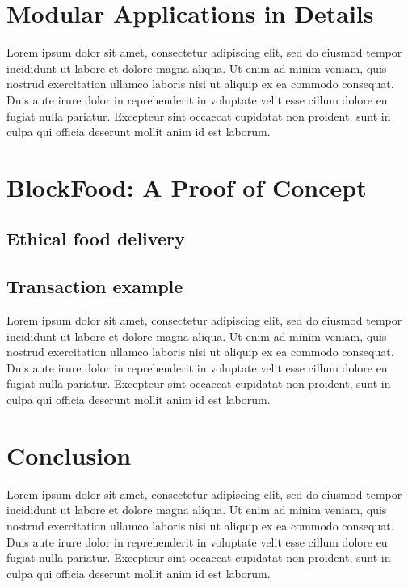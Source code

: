 \documentclass[a4paper]{article}
\begin{document}
\newpage

\section{Modular Applications in Details}

Lorem ipsum dolor sit amet, consectetur adipiscing elit, sed do eiusmod tempor incididunt ut labore et dolore magna aliqua. Ut enim ad minim veniam, quis nostrud exercitation ullamco laboris nisi ut aliquip ex ea commodo consequat. Duis aute irure dolor in reprehenderit in voluptate velit esse cillum dolore eu fugiat nulla pariatur. Excepteur sint occaecat cupidatat non proident, sunt in culpa qui officia deserunt mollit anim id est laborum.

\newpage

\section{BlockFood: A Proof of Concept}

\subsection{Ethical food delivery}

\subsection{Transaction example}

Lorem ipsum dolor sit amet, consectetur adipiscing elit, sed do eiusmod tempor incididunt ut labore et dolore magna aliqua. Ut enim ad minim veniam, quis nostrud exercitation ullamco laboris nisi ut aliquip ex ea commodo consequat. Duis aute irure dolor in reprehenderit in voluptate velit esse cillum dolore eu fugiat nulla pariatur. Excepteur sint occaecat cupidatat non proident, sunt in culpa qui officia deserunt mollit anim id est laborum.

\newpage

\section{Conclusion}

Lorem ipsum dolor sit amet, consectetur adipiscing elit, sed do eiusmod tempor incididunt ut labore et dolore magna aliqua. Ut enim ad minim veniam, quis nostrud exercitation ullamco laboris nisi ut aliquip ex ea commodo consequat. Duis aute irure dolor in reprehenderit in voluptate velit esse cillum dolore eu fugiat nulla pariatur. Excepteur sint occaecat cupidatat non proident, sunt in culpa qui officia deserunt mollit anim id est laborum.
\end{document}
